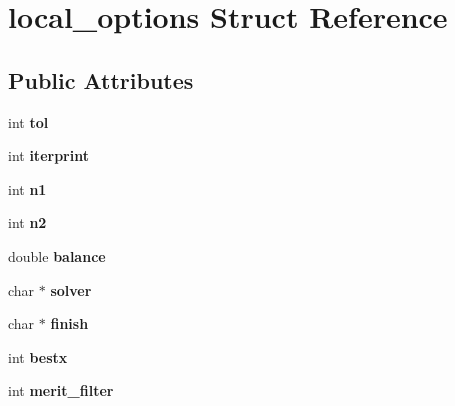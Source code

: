 \hypertarget{structlocal__options}{\section{local\-\_\-options Struct Reference}
\label{structlocal__options}
}
\subsection*{Public Attributes}
\begin{DoxyCompactItemize}
\item 
\hypertarget{structlocal__options_a32c7e4ac255076d4d7c30979e869a356}{int {\bfseries tol}}\label{structlocal__options_a32c7e4ac255076d4d7c30979e869a356}

\item 
\hypertarget{structlocal__options_aefb1d8b0375f1d69e59d35e0b299e0d7}{int {\bfseries iterprint}}\label{structlocal__options_aefb1d8b0375f1d69e59d35e0b299e0d7}

\item 
\hypertarget{structlocal__options_aa2fa5c768ecbb2b98031b0785ef25a63}{int {\bfseries n1}}\label{structlocal__options_aa2fa5c768ecbb2b98031b0785ef25a63}

\item 
\hypertarget{structlocal__options_a738f71394093e7e4d5512183d08d42b5}{int {\bfseries n2}}\label{structlocal__options_a738f71394093e7e4d5512183d08d42b5}

\item 
\hypertarget{structlocal__options_a2f5690eba0fb29d580905fe9d74c98b6}{double {\bfseries balance}}\label{structlocal__options_a2f5690eba0fb29d580905fe9d74c98b6}

\item 
\hypertarget{structlocal__options_afe38244bb3f9bfd3c611ca1b49a623e2}{char $\ast$ {\bfseries solver}}\label{structlocal__options_afe38244bb3f9bfd3c611ca1b49a623e2}

\item 
\hypertarget{structlocal__options_a7b25d99e5c8038c10a93861511b1d090}{char $\ast$ {\bfseries finish}}\label{structlocal__options_a7b25d99e5c8038c10a93861511b1d090}

\item 
\hypertarget{structlocal__options_a99d6cc00a09323fbc4117170b4506cb4}{int {\bfseries bestx}}\label{structlocal__options_a99d6cc00a09323fbc4117170b4506cb4}

\item 
\hypertarget{structlocal__options_af18ca99762ed00b688eea9de22d85be5}{int {\bfseries merit\-\_\-filter}}\label{structlocal__options_af18ca99762ed00b688eea9de22d85be5}


\end{DoxyCompactItemize}
